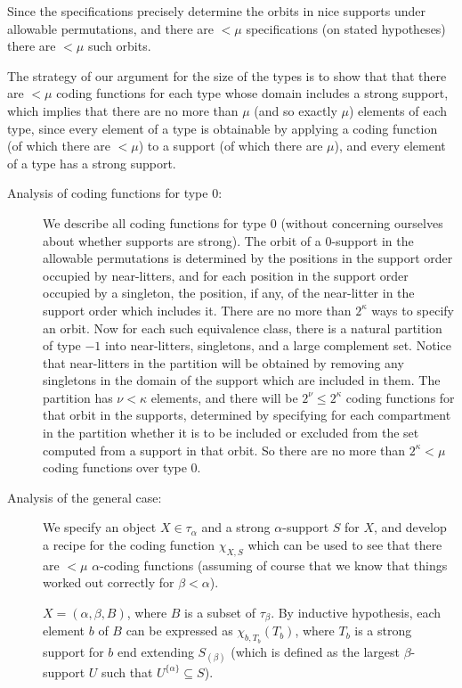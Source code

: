 \documentclass[112pt]{article}
\begin{document}
Since the specifications precisely determine the orbits in nice supports under allowable permutations, and there are $<\mu$ specifications
(on stated hypotheses) there are $<\mu$ such orbits.

The strategy of our argument for the size of the types is to show that that there are $<\mu$ coding functions for each type whose domain includes a strong support, which implies that there are no more than $\mu$ (and so exactly $\mu$) elements of each type, since every element of a type is obtainable by applying a coding function (of which there are $<\mu$) to a support (of which there are $\mu$), and every element of a type has a strong support.

\begin{description}

\item[Analysis of coding functions for type 0:]  We describe all coding functions for type 0 (without concerning ourselves about whether supports are strong).  The orbit of a 0-support in the allowable permutations is determined by the positions in the support order occupied by near-litters, and for each position in the support order occupied by a singleton, the position, if any, of the near-litter in the support order which includes it.  There are no more than $2^\kappa$ ways to specify an orbit.  Now for each such equivalence class, there is a natural partition of type $-1$ into near-litters, singletons, and a large complement set.  Notice that near-litters in the partition will be obtained by removing any singletons in the domain of the support which are included in them.  The partition has $\nu<\kappa$ elements, and there will be $2^\nu\leq 2^\kappa$ coding functions for that orbit in the supports, determined by specifying for each compartment in the partition whether it is to be included or excluded from the set computed from a support in that orbit.  So there are no more than $2^\kappa<\mu$ coding functions over type 0.

\item[Analysis of the general case:]  We specify an object $X\in \tau_\alpha$ and a strong $\alpha$-support $S$ for $X$, and develop a recipe for the coding function $\chi_{X,S}$ which can be used to see that there are $<\mu$ $\alpha$-coding functions (assuming of course that we know that things worked out correctly for $\beta<\alpha$).

$X = (\alpha,\beta,B)$, where $B$ is a subset of $\tau_\beta$.  By inductive hypothesis, each element $b$ of $B$ can be expressed as $\chi_{b,T_b}(T_b)$, where $T_b$ is a strong support for $b$ end extending $S_{(\beta)}$ (which is defined as the largest $\beta$-support $U$ such that $U^{\{\alpha\}} \subseteq S$).


\end{description}
\end{document}
